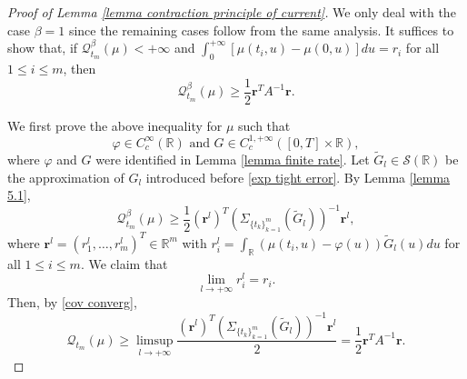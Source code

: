 \documentclass[10pt,a4paper]{amsart}
\newcommand{\R}{\mathbb{R}}
\newcommand{\Scal}{\mathcal{S}}
\begin{document}
\begin{proof}[Proof of Lemma \ref{lemma contraction principle of current}]
	We only deal with the  case $\beta = 1$ since the remaining cases follow from the same analysis.   It suffices to show that, if  $\mathcal{Q}^\beta_{t_m}(\mu)<+\infty$ and $\int_0^{+\infty} [\mu(t_i,u)-\mu(0, u) ] du=r_i$ for all $1\leq i\leq m$, then 
	\[
	\mathcal{Q}^\beta_{t_m} (\mu)\geq \frac{1}{2} \mathbf{r}^T A^{-1} \mathbf{r}.
	\]
	
	We first prove the above inequality for $\mu$ such that
	\begin{equation}\label{equ condition 5.1}
		\varphi \in C^\infty_c(\R) \text{~and~} G \in C_c^{1,+\infty}([0, T]\times \R),
	\end{equation}
where $\varphi$ and $G$ were identified in Lemma \ref{lemma finite rate}. Let $\tilde{G}_l\in \Scal(\R)$ be the approximation of $G_l$ introduced before \eqref{exp tight error}. By Lemma \ref{lemma 5.1},
	\[
	\mathcal{Q}^\beta_{t_m} (\mu)\geq \frac{1}{2} (\mathbf{r}^l)^T\left(\Sigma_{\{t_k\}_{k=1}^m}(\tilde{G}_l)\right)^{-1}\mathbf{r}^l,
	\]
	where $\mathbf{r}^l=(r_1^l,\ldots, r_m^l)^T \in \R^m$ with $r_i^l=\int_{\R}(\mu(t_i, u)-\varphi (u))\tilde{G}_l(u)du$ for all $1\leq i\leq m$.
	We claim that
	\begin{equation}\label{equ claim proof of Lemma 5.2}
		\lim_{l\rightarrow+\infty} r_i^l= r_i.
	\end{equation}
Then, by \eqref{cov converg},
	\[
	\mathcal{Q}_{t_m} (\mu)\geq \limsup_{l\rightarrow+\infty} \frac{(\mathbf{r}^l)^T\left(\Sigma_{\{t_k\}_{k=1}^m}(\tilde{G}_l)\right)^{-1}\mathbf{r}^l}{2} = \frac{1}{2} \mathbf{r}^T A^{-1} \mathbf{r}.
	\]


\end{proof}
\end{document}
